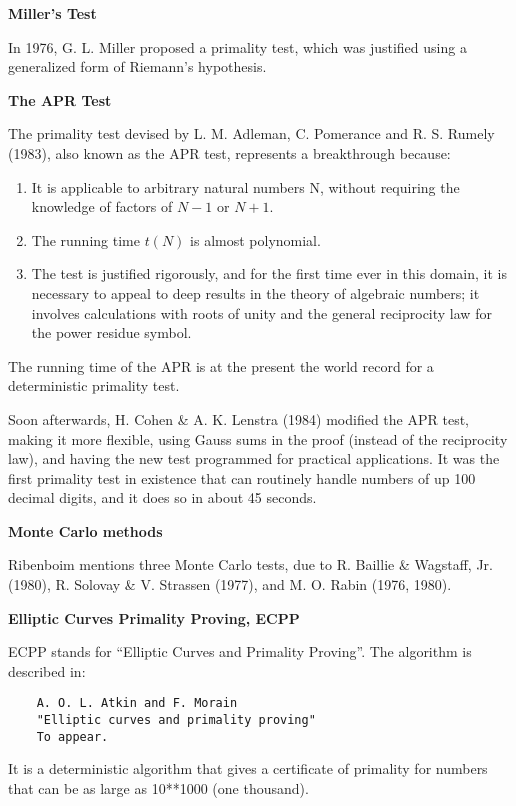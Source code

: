 {\bf Miller's Test}

In 1976, G. L. Miller proposed a primality test, which was justified
using a generalized form of Riemann's hypothesis.


{\bf The APR Test}

The primality test devised by L. M. Adleman, C. Pomerance and R. S.
Rumely (1983), also known as the APR test, represents a breakthrough
because:

\begin{enumerate}
\item It is applicable to arbitrary natural numbers N, without requiring
the knowledge of factors of $N - 1$ or $N + 1$.
\item The running time $t(N)$ is almost polynomial.
\item The test is justified rigorously, and for the first time ever in
this domain, it is necessary to appeal to deep results in the theory of
algebraic numbers; it involves calculations with roots of unity and the
general reciprocity law for the power residue symbol.
\end{enumerate}

The running time of the APR is at the present the world record for a
deterministic primality test.

Soon afterwards, H. Cohen \& A. K. Lenstra (1984) modified the APR test,
making it more flexible, using Gauss sums in the proof (instead of the
reciprocity law), and having the new test programmed for practical
applications. It was the first primality test in existence that can
routinely handle numbers of up 100 decimal digits, and it does so in
about 45 seconds.


{\bf Monte Carlo methods}

Ribenboim mentions three Monte Carlo tests, due to R. Baillie \&
Wagstaff, Jr. (1980), R. Solovay \& V. Strassen (1977), and M. O. Rabin
(1976, 1980).


{\bf Elliptic Curves Primality Proving, ECPP}

ECPP stands for ``Elliptic Curves and Primality Proving''. The algorithm
is described in:

\begin{verbatim}
    A. O. L. Atkin and F. Morain
    "Elliptic curves and primality proving"
    To appear.
\end{verbatim}

It is a deterministic algorithm that gives a certificate of primality
for numbers that can be as large as 10**1000 (one thousand).

